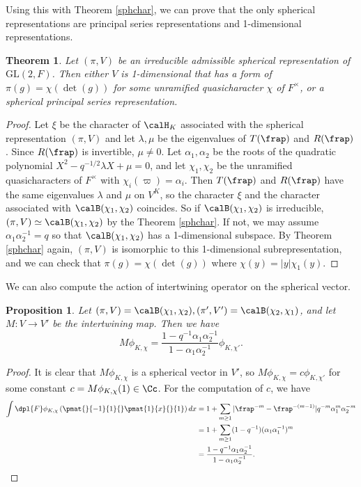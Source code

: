 \documentclass{article}
\newtheorem{theorem}{Theorem}[section]
\newcommand{\GL}{\mathrm{GL}}
\newtheorem{proposition}{Proposition}[section]
\begin{document}
Using this with Theorem \ref{sphchar}, we can prove that the only spherical representations are principal series representations and 1-dimensional representations.
\begin{theorem}
\label{sphps}
Let $(\pi, V)$ be an irreducible admissible spherical representation of $\GL(2, F)$. 
Then either $V$ is 1-dimensional that has a form of $\pi(g) = \chi(\det(g))$ for some unramified quasicharacter $\chi$ of $F^{\times}$, or a spherical principal series representation. 
\end{theorem} 
\begin{proof}
Let $\xi$ be the character of $\calH_K$ associated with the spherical representation $(\pi, V)$ and let $\lambda, \mu$ be the eigenvalues of $T(\frap)$ and $R(\frap)$. 
Since $R(\frap)$ is invertible, $\mu\neq 0$. 
Let $\alpha_1, \alpha_2$ be the roots of the quadratic polynomial $X^{2} - q^{-1/2}\lambda X + \mu = 0$, and let $\chi_1,\chi_2$ be the unramified quasicharacters of $F^{\times}$ with $\chi_i(\varpi) = \alpha_i$. 
Then $T(\frap)$ and $R(\frap)$ have the same eigenvalues $\lambda$ and $\mu$ on $V^{K}$, so the character $\xi$ and the character associated with $\calB(\chi_1, \chi_2)$ coincides. 
So if $\calB(\chi_1, \chi_2)$ is irreducible, $(\pi, V)\simeq \calB(\chi_1, \chi_2)$ by the Theorem \ref{sphchar}. 
If not, we may assume $\alpha_1 \alpha_2^{-1} = q$ so that $\calB(\chi_1, \chi_2)$ has a 1-dimensional subspace. 
By Theorem \ref{sphchar} again, $(\pi, V)$ is isomorphic to this 1-dimensional subrepresentation, and we can check that $\pi(g) = \chi(\det(g))$ where $\chi(y) = |y| \chi_1(y)$. 
\end{proof}

We can also compute the action of intertwining operator on the spherical vector. 
\begin{proposition}
Let $(\pi, V) = \calB(\chi_1, \chi_2), (\pi', V') = \calB(\chi_2, \chi_1)$, and let $M:V\to V'$ be the intertwining map. 
Then we have
$$
M\phi_{K, \chi} = \frac{1-q^{-1}\alpha_{1}\alpha_{2}^{-1}}{1- \alpha_{1}\alpha_{2}^{-1}} \phi_{K, \chi'}. 
$$
\end{proposition}
\begin{proof}
It is clear that $M\phi_{K, \chi}$ is a spherical vector in $V'$, so $M\phi_{K, \chi} = c\phi_{K, \chi'}$ for some constant $c = M\phi_{K, \chi}(1) \in \Cc$. 
For the computation of $c$, we have
\begin{align*}
\int\dpl{F} \phi_{K, \chi}\left(\pmat{}{-1}{1}{} \pmat{1}{x}{}{1}\right) dx &= 1 + \sum_{m\geq 1} |\frap^{-m} - \frap^{-(m-1)}| q^{-m}\alpha_{1}^{m}\alpha_{2}^{-m} \\
&= 1 + \sum_{m\geq 1}(1-q^{-1})(\alpha_{1}\alpha_{1}^{-1})^{m} \\
&= \frac{1-q^{-1}\alpha_{1}\alpha_{2}^{-1}}{1- \alpha_{1}\alpha_{2}^{-1}}.
\end{align*}
\end{proof}
\end{document}
